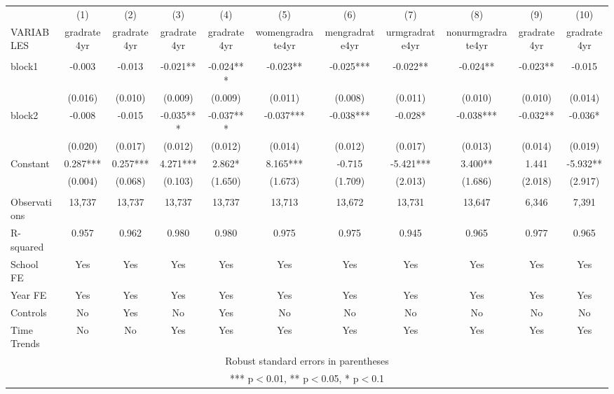 \documentclass[]{article}
\begin{document}
\begin{tabular}{lcccccccccc} \hline
 & (1) & (2) & (3) & (4) & (5) & (6) & (7) & (8) & (9) & (10) \\
VARIABLES & gradrate4yr & gradrate4yr & gradrate4yr & gradrate4yr & womengradrate4yr & mengradrate4yr & urmgradrate4yr & nonurmgradrate4yr & gradrate4yr & gradrate4yr \\ \hline
 &  &  &  &  &  &  &  &  &  &  \\
block1 & -0.003 & -0.013 & -0.021** & -0.024*** & -0.023** & -0.025*** & -0.022** & -0.024** & -0.023** & -0.015 \\
 & (0.016) & (0.010) & (0.009) & (0.009) & (0.011) & (0.008) & (0.011) & (0.010) & (0.010) & (0.014) \\
block2 & -0.008 & -0.015 & -0.035*** & -0.037*** & -0.037*** & -0.038*** & -0.028* & -0.038*** & -0.032** & -0.036* \\
 & (0.020) & (0.017) & (0.012) & (0.012) & (0.014) & (0.012) & (0.017) & (0.013) & (0.014) & (0.019) \\
Constant & 0.287*** & 0.257*** & 4.271*** & 2.862* & 8.165*** & -0.715 & -5.421*** & 3.400** & 1.441 & -5.932** \\
 & (0.004) & (0.068) & (0.103) & (1.650) & (1.673) & (1.709) & (2.013) & (1.686) & (2.018) & (2.917) \\
 &  &  &  &  &  &  &  &  &  &  \\
Observations & 13,737 & 13,737 & 13,737 & 13,737 & 13,713 & 13,672 & 13,731 & 13,647 & 6,346 & 7,391 \\
R-squared & 0.957 & 0.962 & 0.980 & 0.980 & 0.975 & 0.975 & 0.945 & 0.965 & 0.977 & 0.965 \\
School FE & Yes & Yes & Yes & Yes & Yes & Yes & Yes & Yes & Yes & Yes \\
Year FE & Yes & Yes & Yes & Yes & Yes & Yes & Yes & Yes & Yes & Yes \\
Controls & No & Yes & No & Yes & No & No & No & No & No & No \\
 Time Trends & No & No & Yes & Yes & Yes & Yes & Yes & Yes & Yes & Yes \\ \hline
\multicolumn{11}{c}{ Robust standard errors in parentheses} \\
\multicolumn{11}{c}{ *** p$<$0.01, ** p$<$0.05, * p$<$0.1} \\
\end{tabular}
\end{document}
